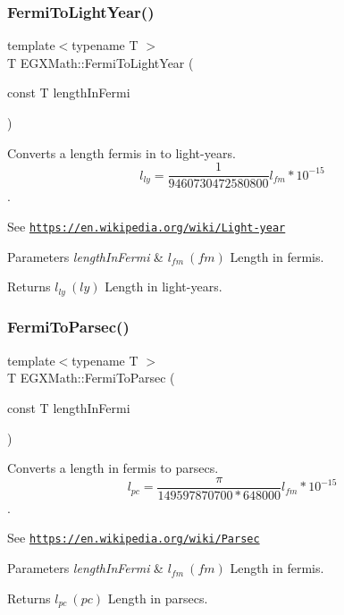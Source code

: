 \subsubsection{\texorpdfstring{Fermi\+To\+Light\+Year()}{FermiToLightYear()}}
{\footnotesize\ttfamily template$<$typename T $>$ \\
T E\+G\+X\+Math\+::\+Fermi\+To\+Light\+Year (\begin{DoxyParamCaption}\item[{const T}]{length\+In\+Fermi }\end{DoxyParamCaption})}



Converts a length fermis in to light-\/years. \[ l_{ly}= \frac{1}{9460730472580800} l_{fm} * 10^{-15} \]. 

See \href{https://en.wikipedia.org/wiki/Light-year}{\tt https\+://en.\+wikipedia.\+org/wiki/\+Light-\/year} 
\begin{DoxyParams}{Parameters}
{\em length\+In\+Fermi} & $ l_{fm}\ (fm)$ Length in fermis. \\
\hline
\end{DoxyParams}
\begin{DoxyReturn}{Returns}
$ l_{ly}\ (ly)$ Length in light-\/years. 
\end{DoxyReturn}
\mbox{\label{group___e_g_x_math-_conversions-_length_conversions-_non-_s_i-_fermi-_astronomical_gab8899d90957bc1951d2173162dca0672}} 
\subsubsection{\texorpdfstring{Fermi\+To\+Parsec()}{FermiToParsec()}}
{\footnotesize\ttfamily template$<$typename T $>$ \\
T E\+G\+X\+Math\+::\+Fermi\+To\+Parsec (\begin{DoxyParamCaption}\item[{const T}]{length\+In\+Fermi }\end{DoxyParamCaption})}



Converts a length in fermis to parsecs. \[ l_{pc}=\frac{\pi}{149597870700 * 648000} l_{fm} * 10^{-15} \]. 

See \href{https://en.wikipedia.org/wiki/Parsec}{\tt https\+://en.\+wikipedia.\+org/wiki/\+Parsec} 
\begin{DoxyParams}{Parameters}
{\em length\+In\+Fermi} & $ l_{fm}\ (fm)$ Length in fermis. \\
\hline
\end{DoxyParams}
\begin{DoxyReturn}{Returns}
$ l_{pc}\ (pc)$ Length in parsecs. 
\end{DoxyReturn}
